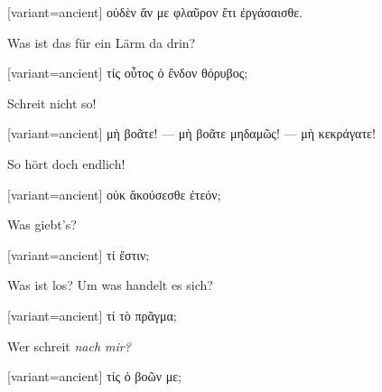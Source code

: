 \begin{greek}[variant=ancient]%
οὐδὲν ἄν με φλαῦρον ἔτι ἐργάσαισθε.

\end{greek}%
Was ist das für ein Lärm da drin?

\switchcolumn

\begin{greek}[variant=ancient]%
τίς οὗτος ὁ ἔνδον θόρυβος;

\end{greek}%
\switchcolumn*

Schreit nicht so!

\switchcolumn

\begin{greek}[variant=ancient]%
μὴ βοᾶτε! — μὴ βοᾶτε μηδαμῶς! — μὴ κεκράγατε!

\end{greek}%
\switchcolumn*

So hört doch endlich!

\switchcolumn

\begin{greek}[variant=ancient]%
οὐκ ἄκούσεσθε ἐτεόν;

\end{greek}%
\switchcolumn*

Was giebt's?

\switchcolumn

\begin{greek}[variant=ancient]%
τί ἔστιν;

\end{greek}%
\switchcolumn*

Was ist los? Um was handelt es sich?

\switchcolumn

\begin{greek}[variant=ancient]%
τί τὸ πρᾶγμα;

\end{greek}%
\switchcolumn*

Wer schreit \emph{nach mir?}

\switchcolumn

\begin{greek}[variant=ancient]%
τίς ὁ βοῶν με;

\end{greek}%
\switchcolumn*

